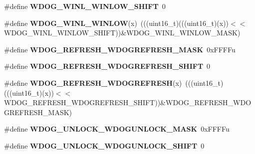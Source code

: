 \begin{DoxyCompactItemize}
\item 
\#define {\bfseries W\+D\+O\+G\+\_\+\+W\+I\+N\+L\+\_\+\+W\+I\+N\+L\+O\+W\+\_\+\+S\+H\+I\+FT}~0\hypertarget{group__WDOG__Register__Masks_ga7f2baf848e4bfe9b0143d073467d1c1a}{}\label{group__WDOG__Register__Masks_ga7f2baf848e4bfe9b0143d073467d1c1a}

\item 
\#define {\bfseries W\+D\+O\+G\+\_\+\+W\+I\+N\+L\+\_\+\+W\+I\+N\+L\+OW}(x)~(((uint16\+\_\+t)(((uint16\+\_\+t)(x))$<$$<$W\+D\+O\+G\+\_\+\+W\+I\+N\+L\+\_\+\+W\+I\+N\+L\+O\+W\+\_\+\+S\+H\+I\+FT))\&W\+D\+O\+G\+\_\+\+W\+I\+N\+L\+\_\+\+W\+I\+N\+L\+O\+W\+\_\+\+M\+A\+SK)\hypertarget{group__WDOG__Register__Masks_gab55f3f4203f758c69ed8ab7e41db69fd}{}\label{group__WDOG__Register__Masks_gab55f3f4203f758c69ed8ab7e41db69fd}

\item 
\#define {\bfseries W\+D\+O\+G\+\_\+\+R\+E\+F\+R\+E\+S\+H\+\_\+\+W\+D\+O\+G\+R\+E\+F\+R\+E\+S\+H\+\_\+\+M\+A\+SK}~0x\+F\+F\+F\+Fu\hypertarget{group__WDOG__Register__Masks_ga59e560838a4c519b514c0def0d6034fa}{}\label{group__WDOG__Register__Masks_ga59e560838a4c519b514c0def0d6034fa}

\item 
\#define {\bfseries W\+D\+O\+G\+\_\+\+R\+E\+F\+R\+E\+S\+H\+\_\+\+W\+D\+O\+G\+R\+E\+F\+R\+E\+S\+H\+\_\+\+S\+H\+I\+FT}~0\hypertarget{group__WDOG__Register__Masks_ga526acc27150ff67f1f026bdcc1bb364c}{}\label{group__WDOG__Register__Masks_ga526acc27150ff67f1f026bdcc1bb364c}

\item 
\#define {\bfseries W\+D\+O\+G\+\_\+\+R\+E\+F\+R\+E\+S\+H\+\_\+\+W\+D\+O\+G\+R\+E\+F\+R\+E\+SH}(x)~(((uint16\+\_\+t)(((uint16\+\_\+t)(x))$<$$<$W\+D\+O\+G\+\_\+\+R\+E\+F\+R\+E\+S\+H\+\_\+\+W\+D\+O\+G\+R\+E\+F\+R\+E\+S\+H\+\_\+\+S\+H\+I\+FT))\&W\+D\+O\+G\+\_\+\+R\+E\+F\+R\+E\+S\+H\+\_\+\+W\+D\+O\+G\+R\+E\+F\+R\+E\+S\+H\+\_\+\+M\+A\+SK)\hypertarget{group__WDOG__Register__Masks_ga08d4fbad4e65e50bf94e1fbf5f48e065}{}\label{group__WDOG__Register__Masks_ga08d4fbad4e65e50bf94e1fbf5f48e065}

\item 
\#define {\bfseries W\+D\+O\+G\+\_\+\+U\+N\+L\+O\+C\+K\+\_\+\+W\+D\+O\+G\+U\+N\+L\+O\+C\+K\+\_\+\+M\+A\+SK}~0x\+F\+F\+F\+Fu\hypertarget{group__WDOG__Register__Masks_gadcf9026f6f2730a765e504ec4c7126a8}{}\label{group__WDOG__Register__Masks_gadcf9026f6f2730a765e504ec4c7126a8}

\item 
\#define {\bfseries W\+D\+O\+G\+\_\+\+U\+N\+L\+O\+C\+K\+\_\+\+W\+D\+O\+G\+U\+N\+L\+O\+C\+K\+\_\+\+S\+H\+I\+FT}~0\hypertarget{group__WDOG__Register__Masks_ga07ed92839744d67e4c393b00bc293246}{}\label{group__WDOG__Register__Masks_ga07ed92839744d67e4c393b00bc293246}


\end{DoxyCompactItemize}
